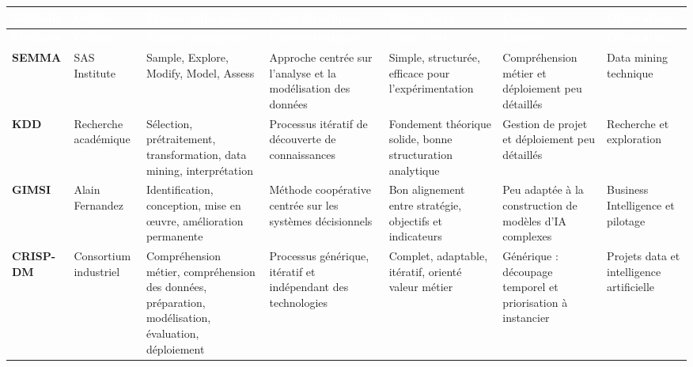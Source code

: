 \begin{longtable}{|P{1.45cm}|P{1.80cm}|P{2.45cm}|P{2.60cm}|P{2.00cm}|P{1.85cm}|P{1.70cm}|}
\hline

\textcolor{white}{\textbf{Méthode}} &
\textcolor{white}{\textbf{Origine}} &
\textcolor{white}{\textbf{Étapes principales}} &
\textcolor{white}{\textbf{Caractéristiques}} &
\textcolor{white}{\textbf{Points forts}} &
\textcolor{white}{\textbf{Limites}} &
\textcolor{white}{\textbf{Orientation}} \\

\hline
\endfirsthead

\hline
{}
\textcolor{white}{\textbf{Méthode}} &
\textcolor{white}{\textbf{Origine}} &
\textcolor{white}{\textbf{Étapes principales}} &
\textcolor{white}{\textbf{Caractéristiques}} &
\textcolor{white}{\textbf{Points forts}} &
\textcolor{white}{\textbf{Limites}} &
\textcolor{white}{\textbf{Orientation}} \\

\hline
\endhead

\hline
\endfoot

\hline
\endlastfoot

\textbf{SEMMA} &
SAS Institute &
Sample, Explore, Modify, Model, Assess &
Approche centrée sur l'analyse et la modélisation des données &
Simple, structurée, efficace pour l'expérimentation &
Compréhension métier et déploiement peu détaillés &
Data mining technique \\

\hline

\textbf{KDD} &
Recherche académique &
Sélection, prétraitement, transformation, data mining, interprétation &
Processus itératif de découverte de connaissances &
Fondement théorique solide, bonne structuration analytique &
Gestion de projet et déploiement peu détaillés &
Recherche et exploration \\

\hline

\textbf{GIMSI} &
Alain Fernandez &
Identification, conception, mise en œuvre, amélioration permanente &
Méthode coopérative centrée sur les systèmes décisionnels &
Bon alignement entre stratégie, objectifs et indicateurs &
Peu adaptée à la construction de modèles d'IA complexes &
Business Intelligence et pilotage \\

\hline

\textbf{CRISP-DM} &
Consortium industriel &
Compréhension métier, compréhension des données, préparation, modélisation, évaluation, déploiement &
Processus générique, itératif et indépendant des technologies &
Complet, adaptable, itératif, orienté valeur métier &
Générique : découpage temporel et priorisation à instancier &
Projets data et intelligence artificielle \\


\end{longtable}
